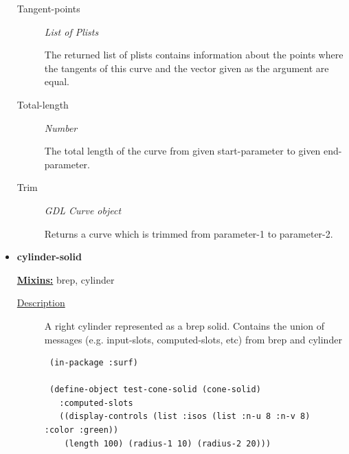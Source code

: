 \documentclass [11pt]{book}
\begin{document}
\begin{itemize}
\begin{description}
\item [Tangent-points]
\emph{List of Plists}

 The returned list of plists contains information about the points where the tangents of this curve and the vector given as the argument
are equal.




\item [Total-length]
\emph{Number}

 The total length of the curve from given start-parameter to given end-parameter.




\item [Trim]
\emph{GDL Curve object}

 Returns a curve which is trimmed from parameter-1 to parameter-2.




\end{description}







\item {}
\label{prim:cylinder-solid}
\textbf{cylinder-solid}


\textbf{
\underline{Mixins:}} brep, cylinder





\begin{description}

\item [
\underline{Description}]


A right cylinder represented as a brep solid. Contains the union of messages (e.g. input-slots, computed-slots, etc)
from brep and cylinder



\end{description}




\begin{figure}
\begin{lrbox}{\boxedverb}
\begin{minipage}{\linewidth}
{\small

\begin{verbatim}
 (in-package :surf)

 (define-object test-cone-solid (cone-solid)
   :computed-slots
   ((display-controls (list :isos (list :n-u 8 :n-v 8) :color :green))
    (length 100) (radius-1 10) (radius-2 20)))
 

\end{verbatim}}
\end{minipage}
\end{lrbox}
\end{figure}
\end{itemize}
\end{document}
